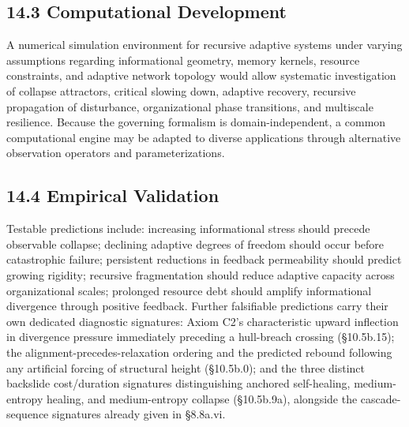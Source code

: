 \documentclass[
]{article}
\begin{document}
\hypertarget{computational-development}{%
\subsection{14.3 Computational
Development}\label{computational-development}}

A numerical simulation environment for recursive adaptive systems under
varying assumptions regarding informational geometry, memory kernels,
resource constraints, and adaptive network topology would allow
systematic investigation of collapse attractors, critical slowing down,
adaptive recovery, recursive propagation of disturbance, organizational
phase transitions, and multiscale resilience. Because the governing
formalism is domain-independent, a common computational engine may be
adapted to diverse applications through alternative observation
operators and parameterizations.

\hypertarget{empirical-validation}{%
\subsection{14.4 Empirical Validation}\label{empirical-validation}}

Testable predictions include: increasing informational stress should
precede observable collapse; declining adaptive degrees of freedom
should occur before catastrophic failure; persistent reductions in
feedback permeability should predict growing rigidity; recursive
fragmentation should reduce adaptive capacity across organizational
scales; prolonged resource debt should amplify informational divergence
through positive feedback. Further falsifiable predictions carry their
own dedicated diagnostic signatures: Axiom C2's characteristic upward
inflection in divergence pressure immediately preceding a hull-breach
crossing (§10.5b.15); the alignment-precedes-relaxation ordering and the
predicted rebound following any artificial forcing of structural height
(§10.5b.0); and the three distinct backslide cost/duration signatures
distinguishing anchored self-healing, medium-entropy healing, and
medium-entropy collapse (§10.5b.9a), alongside the cascade-sequence
signatures already given in §8.8a.vi.
\end{document}
